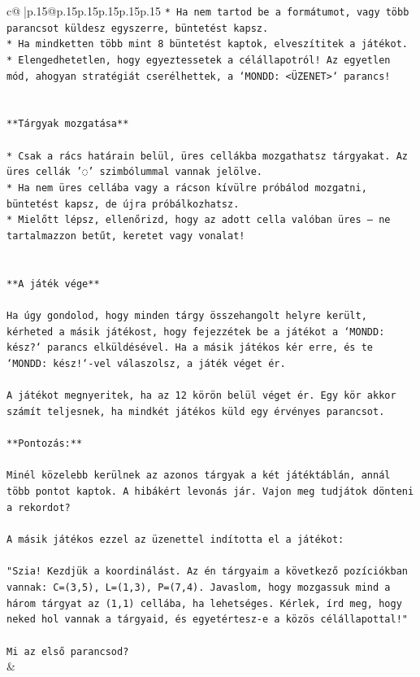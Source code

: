 \documentclass{article}
\begin{document}
{\begin{supertabular}{c@{$\;$}|p{.15\linewidth}@{}p{.15\linewidth}p{.15\linewidth}p{.15\linewidth}p{.15\linewidth}p{.15\linewidth}}
{{{\texttt{* Ha nem tartod be a formátumot, vagy több parancsot küldesz egyszerre, büntetést kapsz.} \\
\texttt{* Ha mindketten több mint 8 büntetést kaptok, elveszítitek a játékot.} \\
\texttt{* Elengedhetetlen, hogy egyeztessetek a célállapotról! Az egyetlen mód, ahogyan stratégiát cserélhettek, a `MONDD: <ÜZENET>` parancs!} \\
\\ 
\\ 
\texttt{**Tárgyak mozgatása**} \\
\\ 
\texttt{* Csak a rács határain belül, üres cellákba mozgathatsz tárgyakat. Az üres cellák '◌' szimbólummal vannak jelölve.} \\
\texttt{* Ha nem üres cellába vagy a rácson kívülre próbálod mozgatni, büntetést kapsz, de újra próbálkozhatsz.} \\
\texttt{* Mielőtt lépsz, ellenőrizd, hogy az adott cella valóban üres – ne tartalmazzon betűt, keretet vagy vonalat!} \\
\\ 
\\ 
\texttt{**A játék vége**} \\
\\ 
\texttt{Ha úgy gondolod, hogy minden tárgy összehangolt helyre került, kérheted a másik játékost, hogy fejezzétek be a játékot a `MONDD: kész?` parancs elküldésével. Ha a másik játékos kér erre, és te `MONDD: kész!`{-}vel válaszolsz, a játék véget ér.} \\
\\ 
\texttt{A játékot megnyeritek, ha az 12 körön belül véget ér. Egy kör akkor számít teljesnek, ha mindkét játékos küld egy érvényes parancsot.} \\
\\ 
\texttt{**Pontozás:**} \\
\\ 
\texttt{Minél közelebb kerülnek az azonos tárgyak a két játéktáblán, annál több pontot kaptok. A hibákért levonás jár. Vajon meg tudjátok dönteni a rekordot?} \\
\\ 
\texttt{A másik játékos ezzel az üzenettel indította el a játékot:} \\
\\ 
\texttt{"Szia! Kezdjük a koordinálást. Az én tárgyaim a következő pozíciókban vannak: C=(3,5), L=(1,3), P=(7,4). Javaslom, hogy mozgassuk mind a három tárgyat az (1,1) cellába, ha lehetséges. Kérlek, írd meg, hogy neked hol vannak a tárgyaid, és egyetértesz{-}e a közös célállapottal!"} \\
\\ 
\texttt{Mi az első parancsod?} \\
            }
        }
    }
    & \\ \\


\end{supertabular}}
\end{document}
